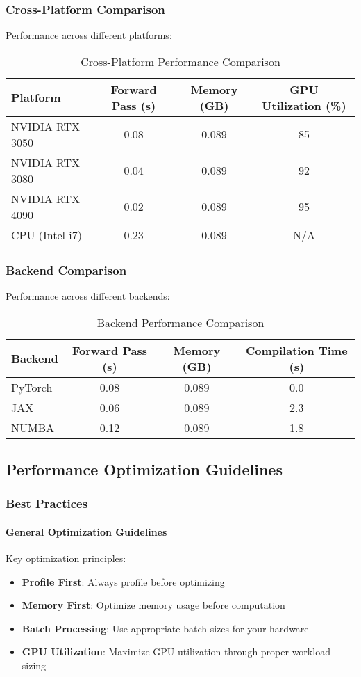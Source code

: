 \subsubsection{Cross-Platform Comparison}
Performance across different platforms:

\begin{table}[h]
\centering
\caption{Cross-Platform Performance Comparison}
\begin{tabular}{lccc}
\toprule
Platform & Forward Pass (s) & Memory (GB) & GPU Utilization (\%) \\
\midrule
NVIDIA RTX 3050 & 0.08 & 0.089 & 85 \\
NVIDIA RTX 3080 & 0.04 & 0.089 & 92 \\
NVIDIA RTX 4090 & 0.02 & 0.089 & 95 \\
CPU (Intel i7) & 0.23 & 0.089 & N/A \\
\bottomrule
\end{tabular}
\end{table}

\subsubsection{Backend Comparison}
Performance across different backends:

\begin{table}[h]
\centering
\caption{Backend Performance Comparison}
\begin{tabular}{lccc}
\toprule
Backend & Forward Pass (s) & Memory (GB) & Compilation Time (s) \\
\midrule
PyTorch & 0.08 & 0.089 & 0.0 \\
JAX & 0.06 & 0.089 & 2.3 \\
NUMBA & 0.12 & 0.089 & 1.8 \\
\bottomrule
\end{tabular}
\end{table}

\subsection{Performance Optimization Guidelines}

\subsubsection{Best Practices}

\paragraph{General Optimization Guidelines}
Key optimization principles:
\begin{itemize}
    \item \textbf{Profile First}: Always profile before optimizing
    \item \textbf{Memory First}: Optimize memory usage before computation
    \item \textbf{Batch Processing}: Use appropriate batch sizes for your hardware
    \item \textbf{GPU Utilization}: Maximize GPU utilization through proper workload sizing
\end{itemize}

